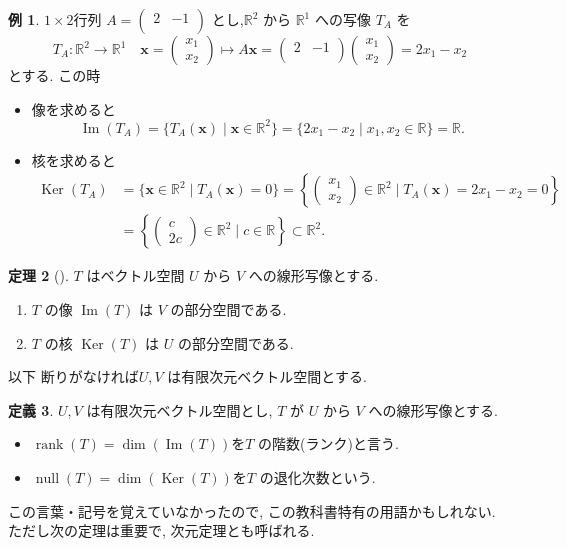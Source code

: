\documentclass[dvipdfmx,a4paper,11pt]{article} %
\newcommand{\R}{\mathbb{R}}
\theoremstyle{definition}
\newtheorem{thm}{定理}[section]
\newtheorem{defn}[thm]{定義}
\newtheorem{ex}[thm]{例}
\begin{document}
\begin{ex}
$1 \times 2$行列
$A=\begin{pmatrix}
2&-1\\
\end{pmatrix}
$
とし,\(\mathbb{R}^2\) から \(\mathbb{R}^1\) への写像 \(T_A\) を
\[
T_A : \R^2 \to \R^1
\quad 
\bm{x}=
\begin{pmatrix}
x_1\\
x_2
\end{pmatrix}
 \mapsto A\bm{x}
 =
\begin{pmatrix}
2&-1\\
\end{pmatrix} 
\begin{pmatrix}
x_1\\
x_2
\end{pmatrix}
=
2x_1-x_2
\]
とする. 
この時
\begin{itemize}
\item 像を求めると
 \[
\operatorname{Im}(T_A)=\{T_A(\bm{x}) \mid \bm{x}\in \R^2\} 
=\{2x_1-x_2 \mid x_1, x_2 \in \R \}
=\R. 
\]
\item 核を求めると
\begin{align*}
\operatorname{Ker}(T_A)
&=
\{\bm{x}\in \R^2\mid T_A(\bm{x})=0\}
=
\left\{
\begin{pmatrix}
x_1\\
x_2
\end{pmatrix}
\in \R^2\mid T_A(\bm{x})=2x_1-x_2=0
\right\}
\\
&=
\left\{
\begin{pmatrix}
c\\
2c
\end{pmatrix}
\in \R^2\mid c \in \R
\right\}
 \subset \R^2.
\end{align*}
\end{itemize}
\end{ex}


\begin{thm}[{\cite[定理5.1.1]{M}}] 
\(T\) はベクトル空間 \(U\) から \(V\) への線形写像とする.
\begin{enumerate}
\item \(T\) の像 \(\operatorname{Im}(T)\) は \(V\) の部分空間である.
\item \(T\) の核 \(\operatorname{Ker}(T)\) は \(U\) の部分空間である.
\end{enumerate}
\end{thm}

以下 断りがなければ\(U,V\) は有限次元ベクトル空間とする.

\begin{defn}
\(U,V\) は有限次元ベクトル空間とし, 
\(T\) が \(U\) から \(V\) への線形写像とする. 
\begin{itemize}
\item $\operatorname{rank}(T)=\dim(\operatorname{Im}(T))$を\(T\) の階数(ランク)と言う. 
\item $\operatorname{null}(T)=\dim(\operatorname{Ker}(T))$を\(T\) の退化次数という.
\end{itemize}
\end{defn}
この言葉・記号を覚えていなかったので, この教科書特有の用語かもしれない. 
ただし次の定理は重要で, 次元定理とも呼ばれる. 
\end{document}
